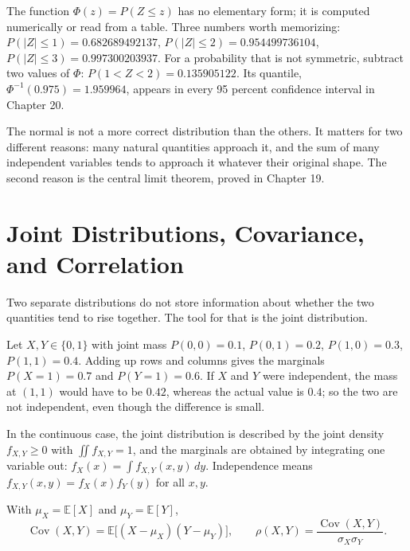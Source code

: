 The function $\Phi(z)=P(Z\le z)$ has no elementary form; it is computed numerically or
read from a table. Three numbers worth memorizing: $P(|Z|\le1)=0.682689492137$,
$P(|Z|\le2)=0.954499736104$, $P(|Z|\le3)=0.997300203937$. For a probability that is not
symmetric, subtract two values of $\Phi$: $P(1<Z<2)=0.135905122$. Its quantile,
$\Phi^{-1}(0.975)=1.959964$, appears in every 95 percent confidence interval in
Chapter 20.

The normal is not a more correct distribution than the others. It matters for two
different reasons: many natural quantities approach it, and the sum of many independent variables
tends to approach it whatever their original shape. The second reason is the central limit
theorem, proved in Chapter 19.



\section{Joint Distributions, Covariance, and Correlation}

Two separate distributions do not store information about whether the two quantities
tend to rise together. The tool for that is the joint distribution.

\begin{contoh}
Let $X,Y\in\{0,1\}$ with joint mass $P(0,0)=0.1$, $P(0,1)=0.2$,
$P(1,0)=0.3$, $P(1,1)=0.4$. Adding up rows and columns gives the marginals
$P(X=1)=0.7$ and $P(Y=1)=0.6$. If $X$ and $Y$ were independent, the mass at $(1,1)$
would have to be $0.42$, whereas the actual value is $0.4$; so the two are not independent,
even though the difference is small.
\end{contoh}

In the continuous case, the joint distribution is described by the joint density
$f_{X,Y}\ge0$ with $\iint f_{X,Y}=1$, and the marginals are obtained by
integrating one variable out: $f_X(x)=\int f_{X,Y}(x,y)\,dy$. Independence means
$f_{X,Y}(x,y)=f_X(x)f_Y(y)$ for all $x,y$.

\begin{definisi}
With $\mu_X=\mathbb{E}[X]$ and $\mu_Y=\mathbb{E}[Y]$,
\[
\operatorname{Cov}(X,Y)=\mathbb{E}\bigl[(X-\mu_X)(Y-\mu_Y)\bigr],
\qquad
\rho(X,Y)=\frac{\operatorname{Cov}(X,Y)}{\sigma_X\sigma_Y}.
\]
\end{definisi}

